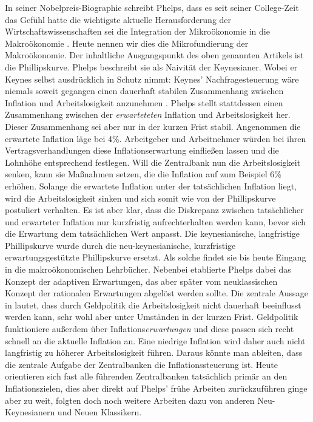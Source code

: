 In seiner Nobelpreis-Biographie schreibt Phelps, dass es seit seiner College-Zeit das Gefühl hatte die wichtigste aktuelle Herausforderung der Wirtschaftswissenschaften sei die Integration der Mikroökonomie in die Makroökonomie \parencite{Phelps2006}. Heute nennen wir dies die Mikrofundierung der Makroökonomie.
Der inhaltliche Ausgangspunkt des oben genannten Artikels \parencite{Phelps1968} ist die Phillipskurve. Phelps beschreibt sie als Naivität der Keynesianer. Wobei er Keynes selbst ausdrücklich in Schutz nimmt: Keynes' Nachfragesteuerung wäre niemals soweit gegangen einen dauerhaft stabilen Zusammenhang zwischen Inflation und Arbeitslosigkeit anzunehmen \parencite{Phelps2006}. Phelps stellt stattdessen einen Zusammenhang zwischen der \textit{erwarteteten} Inflation und Arbeitslosigkeit her. Dieser Zusammenhang sei aber nur in der kurzen Frist stabil. Angenommen die erwartete Inflation läge bei 4\%. Arbeitgeber und Arbeitnehmer würden bei ihren Vertragsverhandlungen diese Inflationserwartung einfließen lassen und die Lohnhöhe entsprechend festlegen. Will die Zentralbank nun die Arbeitslosigkeit senken, kann sie Maßnahmen setzen, die die Inflation auf zum Beispiel 6\% erhöhen. Solange die erwartete Inflation unter der tatsächlichen Inflation liegt, wird die Arbeitslosigkeit sinken und sich somit wie von der Phillipskurve postuliert verhalten. Es ist aber klar, dass die Diskrepanz zwischen tatsächlicher und erwarteter Inflation nur kurzfristig aufrechterhalten werden kann, bevor sich die Erwartung dem tatsächlichen Wert anpasst. Die keynesianische, langfristige Phillipskurve wurde durch die neu-keynesianische, kurzfristige erwartungsgestützte Phillipskurve ersetzt. Als solche findet sie bis heute Eingang in die makroökonomischen Lehrbücher. Nebenbei etablierte Phelps dabei das Konzept der adaptiven Erwartungen, das aber später vom neuklassischen Konzept der rationalen Erwartungen abgelöst werden sollte.
Die zentrale Aussage in \textcite{Phelps1968} lautet, dass durch Geldpolitik die Arbeitslosigkeit nicht dauerhaft beeinflusst werden kann, sehr wohl aber unter Umständen in der kurzen Frist. Geldpolitik funktioniere außerdem über Inflations\textit{erwartungen} und diese passen sich recht schnell an die aktuelle Inflation an. Eine niedrige Inflation wird daher auch nicht langfristig zu höherer Arbeitslosigkeit führen\parencite{Phelps1967}. Daraus könnte man ableiten, dass die zentrale Aufgabe der Zentralbanken die Inflationssteuerung ist. Heute orientieren sich fast alle führenden Zentralbanken tatsächlich primär an den Inflationszielen, dies aber direkt auf Phelps' frühe Arbeiten zurückzuführen ginge aber zu weit, folgten doch noch weitere Arbeiten dazu von anderen Neu-Keynesianern und Neuen Klassikern.
